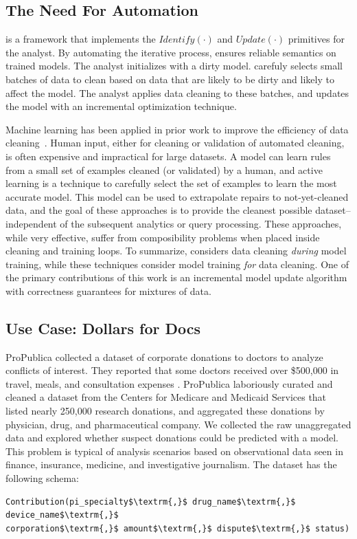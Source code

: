 \subsection{The Need For Automation}\label{alrw}
\sys is a framework that implements the $Identify(\cdot)$ and $Update(\cdot)$ primitives for the analyst. 
By automating the iterative process, \sys ensures reliable semantics on trained models.
The analyst initializes \sys with a dirty model.
\sys carefuly selects small batches of data to clean based on data that are likely to be dirty and likely to affect the model.
The analyst applies data cleaning to these batches, and \sys updates the model with an incremental optimization technique.

Machine learning has been applied in prior work to improve the efficiency of data cleaning~\cite{yakout2013don,DBLP:journals/pvldb/YakoutENOI11,gokhale2014corleone}.
Human input, either for cleaning or validation of automated cleaning, is often expensive and impractical for large datasets.
A model can learn rules from a small set of examples cleaned (or validated) by a human, and active learning is a technique to carefully select the set of examples to learn the most accurate model.
This model can be used to extrapolate repairs to not-yet-cleaned data, and the goal of these approaches is to provide the cleanest possible dataset--independent of the subsequent analytics or query processing.
These approaches, while very effective, suffer from composibility problems when placed inside cleaning and training loops.
To summarize, \sys considers data cleaning \emph{during} model training, while these techniques consider model training \emph{for} data cleaning.
One of the primary contributions of this work is an incremental model update algorithm with correctness guarantees for mixtures of data.

\subsection{Use Case: Dollars for Docs \cite{dollarsfordocs}}\label{s:usecase}
ProPublica collected a dataset of corporate donations to doctors to analyze conflicts of interest. 
They reported that some doctors received over \$500,000 in travel, meals, and consultation expenses \cite{dollarsfordocsa}.
ProPublica laboriously curated and cleaned a dataset from the Centers for Medicare and Medicaid Services that listed nearly 250,000 research donations, and aggregated these donations by physician, drug, and pharmaceutical company.
We collected the raw unaggregated data and explored whether suspect donations could be predicted with a model.
This problem is typical of analysis scenarios based on observational data seen in finance, insurance, medicine, and investigative journalism.
The dataset has the following schema:
\begin{lstlisting}[mathescape,basicstyle={\scriptsize}]
Contribution(pi_specialty$\textrm{,}$ drug_name$\textrm{,}$ device_name$\textrm{,}$
corporation$\textrm{,}$ amount$\textrm{,}$ dispute$\textrm{,}$ status)
\end{lstlisting}

